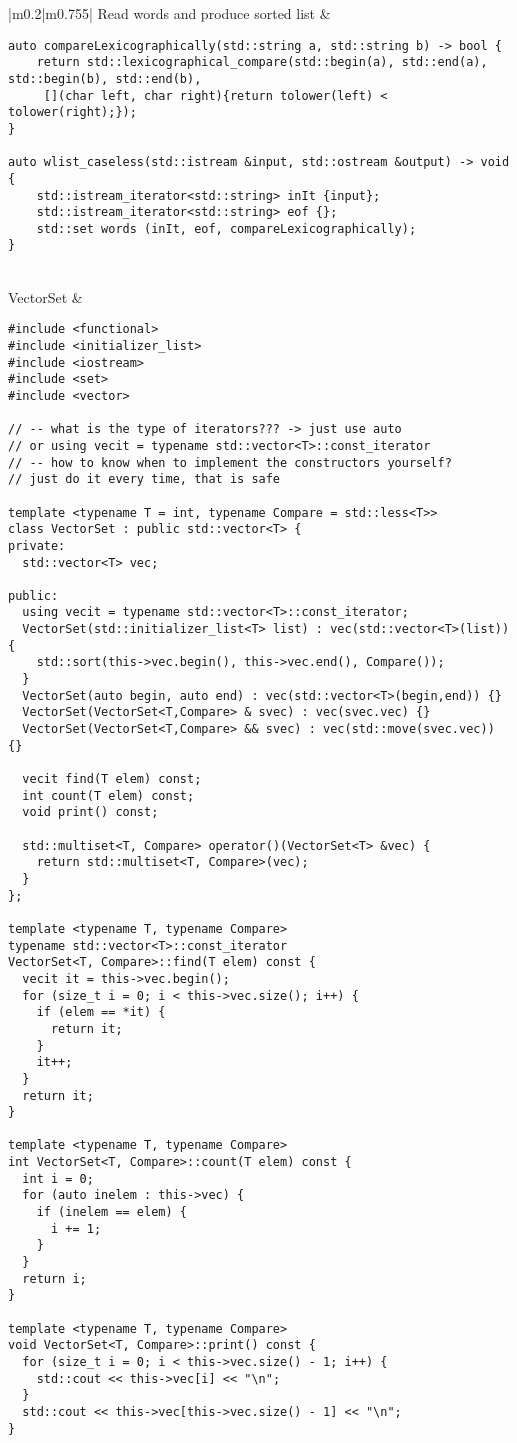 \documentclass[main.tex,fontsize=8pt,paper=a4,paper=portrait,DIV=calc]{scrartcl}
\begin{document}
\begin{table}[ht!]
\begin{tabular}{|m{0.2\linewidth}|m{0.755\linewidth}|}
\hline
Read words and produce sorted list & 
\begin{lstlisting}
auto compareLexicographically(std::string a, std::string b) -> bool {
    return std::lexicographical_compare(std::begin(a), std::end(a), std::begin(b), std::end(b),
     [](char left, char right){return tolower(left) < tolower(right);});
}

auto wlist_caseless(std::istream &input, std::ostream &output) -> void {
    std::istream_iterator<std::string> inIt {input};
    std::istream_iterator<std::string> eof {};
    std::set words (inIt, eof, compareLexicographically);
}
\end{lstlisting}
\\
\hline
VectorSet & 
\vspace{2mm}
\begin{lstlisting}
#include <functional>
#include <initializer_list>
#include <iostream>
#include <set>
#include <vector>

// -- what is the type of iterators??? -> just use auto
// or using vecit = typename std::vector<T>::const_iterator
// -- how to know when to implement the constructors yourself?
// just do it every time, that is safe

template <typename T = int, typename Compare = std::less<T>>
class VectorSet : public std::vector<T> {
private:
  std::vector<T> vec;

public:
  using vecit = typename std::vector<T>::const_iterator;
  VectorSet(std::initializer_list<T> list) : vec(std::vector<T>(list)) {
    std::sort(this->vec.begin(), this->vec.end(), Compare());
  }
  VectorSet(auto begin, auto end) : vec(std::vector<T>(begin,end)) {}
  VectorSet(VectorSet<T,Compare> & svec) : vec(svec.vec) {}
  VectorSet(VectorSet<T,Compare> && svec) : vec(std::move(svec.vec)) {}

  vecit find(T elem) const;
  int count(T elem) const;
  void print() const;

  std::multiset<T, Compare> operator()(VectorSet<T> &vec) {
    return std::multiset<T, Compare>(vec);
  }
};

template <typename T, typename Compare>
typename std::vector<T>::const_iterator
VectorSet<T, Compare>::find(T elem) const {
  vecit it = this->vec.begin();
  for (size_t i = 0; i < this->vec.size(); i++) {
    if (elem == *it) {
      return it;
    }
    it++;
  }
  return it;
}

template <typename T, typename Compare>
int VectorSet<T, Compare>::count(T elem) const {
  int i = 0;
  for (auto inelem : this->vec) {
    if (inelem == elem) {
      i += 1;
    }
  }
  return i;
}

template <typename T, typename Compare>
void VectorSet<T, Compare>::print() const {
  for (size_t i = 0; i < this->vec.size() - 1; i++) {
    std::cout << this->vec[i] << "\n";
  }
  std::cout << this->vec[this->vec.size() - 1] << "\n";
}
\end{lstlisting}
\\
\hline
\end{tabular}
\end{table}
\end{document}
